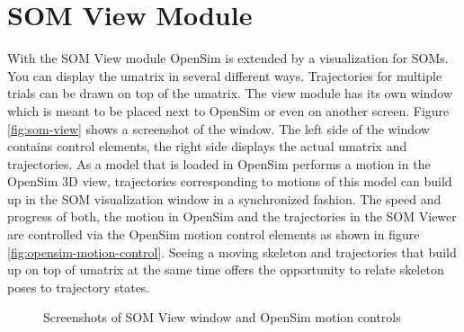\documentclass[a4paper]{scrartcl}
\begin{document}
\section{SOM View Module}
With the SOM View module OpenSim is extended by a visualization for SOMs. You can display the umatrix in several different ways. Trajectories for multiple trials can be drawn on top of the umatrix. The view module has its own window which is meant to be placed next to OpenSim or even on another screen. Figure \ref{fig:som-view} shows a screenshot of the window. The left side of the window contains control elements, the right side displays the actual umatrix and trajectories. As a model that is loaded in OpenSim performs a motion in the OpenSim 3D view, trajectories corresponding to motions of this model can build up in the SOM visualization window in a synchronized fashion. The speed and progress of both, the motion in OpenSim and the trajectories in the SOM Viewer are controlled via the OpenSim motion control elements as shown in figure \ref{fig:opensim-motion-control}. Seeing a moving skeleton and trajectories that build up on top of umatrix at the same time offers the opportunity to relate skeleton poses to trajectory states.
\begin{figure}
\centering
{}
\caption{Screenshots of SOM View window and OpenSim motion controls}
\label{fig:som-view-and-mot-controls}
\end{figure}
\end{document}
